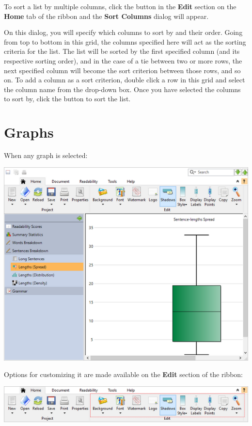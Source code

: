 \documentclass[
]{book}
\theoremstyle{definition}
\theoremstyle{definition}
\theoremstyle{definition}
\theoremstyle{definition}
\theoremstyle{remark}
\begin{document}
To sort a list by multiple columns, click the  button in the \textbf{Edit} section on the \textbf{Home} tab of the ribbon and the \textbf{Sort Columns} dialog will appear.

On this dialog, you will specify which columns to sort by and their order. Going from top to bottom in this grid, the columns specified here will act as the sorting criteria for the list. The list will be sorted by the first specified column (and its respective sorting order), and in the case of a tie between two or more rows, the next specified column will become the sort criterion between those rows, and so on. To add a column as a sort criterion, double click a row in this grid and select the column name from the drop-down box. Once you have selected the columns to sort by, click the  button to sort the list.

\hypertarget{graphs}{%
\section{Graphs}\label{graphs}}

\begin{minipage}{\textwidth}
When any graph is selected:

\includegraphics{Images/SentenceBoxPlotSelected.png}

\end{minipage}

Options for customizing it are made available on the \textbf{Edit} section of the ribbon:

\includegraphics{Images/RibbonEditGraphs.png}
\end{document}
